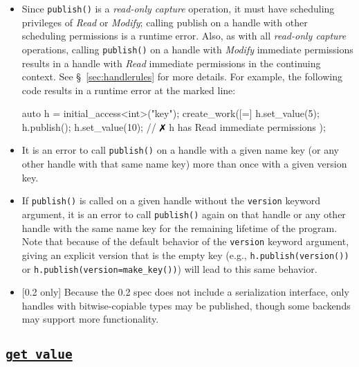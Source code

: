 \begin{subs}
\begin{itemize}
  \item Since \texttt{publish()} is a {\it read-only capture} operation, it must
  have scheduling privileges of {\it Read} or {\it Modify}; calling publish on a
  handle with other scheduling permissions is a runtime error.  Also, as with
  all {\it read-only capture} operations, calling \texttt{publish()} on a
  handle with {\it Modify} immediate permissions results in a handle with {\it
  Read} immediate permissions in the continuing context.  See
  \S~\ref{sec:handlerules} for more details.  For example, the following code
  results in a runtime error at the marked line:
\begin{minipage}[t]{0.95\linewidth}%
  \centering
  \begin{CppCode}
  auto h = initial_access<int>("key");
  create_work([=]{
    h.set_value(5);
    h.publish();
    h.set_value(10); // $\no$ h has Read immediate permissions
  });
  \end{CppCode}
\end{minipage}
  \item It is an error to call \texttt{publish()} on a handle with a given
  name key (or any other handle with that same name key) more than once with
  a given version key.
  \item If \texttt{publish()} is called on a given handle without the
  \texttt{version} keyword argument, it is an error to call \texttt{publish()}
  again on that handle or any other handle with the same name key for the
  remaining lifetime of the program.  Note that because of the default behavior
  of the \texttt{version} keyword argument, giving an explicit version that is
  the empty key (e.g., \texttt{h.publish(version())} or
  \texttt{h.publish(version=make\_key())}) will lead to this same behavior.
  \item {\color{red} [0.2 only]} Because the 0.2 spec does not include a
  serialization interface, only handles with bitwise-copiable types may be
  published, though some backends may support more functionality.
\end{itemize}


\end{subs}




\clearpage
\subsection{\underline{\texttt{get\_value}}}

